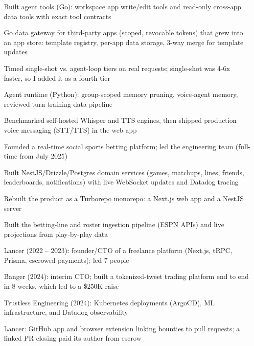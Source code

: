 \documentclass[print]{jack-resume}
\begin{document}
\begin{tightemize}
    \item Built agent tools (Go): workspace app write/edit tools and read-only cross-app data tools with exact tool contracts
    \item Go data gateway for third-party apps (scoped, revocable tokens) that grew into an app store: template registry, per-app data storage, 3-way merge for template updates
    \item Timed single-shot vs. agent-loop tiers on real requests; single-shot was 4-6x faster, so I added it as a fourth tier
    \item Agent runtime (Python): group-scoped memory pruning, voice-agent memory, reviewed-turn training-data pipeline
    \item Benchmarked self-hosted Whisper and TTS engines, then shipped production voice messaging (STT/TTS) in the web app
\end{tightemize}
\sectionsep

\begin{tightemize}
    \item Founded a real-time social sports betting platform; led the engineering team (full-time from July 2025)
    \item Built NestJS/Drizzle/Postgres domain services (games, matchups, lines, friends, leaderboards, notifications) with live WebSocket updates and Datadog tracing
    \item Rebuilt the product as a Turborepo monorepo: a Next.js web app and a NestJS server
    \item Built the betting-line and roster ingestion pipeline (ESPN APIs) and live projections from play-by-play data
\end{tightemize}
\sectionsep

\begin{tightemize}
    \item Lancer (2022 -- 2023): founder/CTO of a freelance platform (Next.js, tRPC, Prisma, escrowed payments); led 7 people
    \item Banger (2024): interim CTO; built a tokenized-tweet trading platform end to end in 8 weeks, which led to a \$250K raise
    \item Trustless Engineering (2024): Kubernetes deployments (ArgoCD), ML infrastructure, and Datadog observability
    \item Lancer: GitHub app and browser extension linking bounties to pull requests; a linked PR closing paid its author from escrow
\end{tightemize}
\sectionsep
\end{document}
